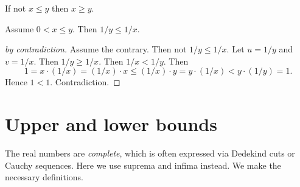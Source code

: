 \documentclass{article}
\begin{document}
\begin{forthel}
\begin{lemma}[syz]
If not $x \leq y$ then $x \geq y$.
\end{lemma}

\begin{proposition}
Assume $0 < x \leq y$.
Then $1/y \leq 1/x$.
\end{proposition}
\begin{proof}[by contradiction]
Assume the contrary. 
Then not $1/y \leq 1/x$. Let $u = 1/y$ and $v = 1/x$.
Then $1/y \geq 1/x$.
Then $1/x < 1/y$.
Then
\[ 1 = x \cdot (1/x) = (1/x) \cdot x \leq (1/x) \cdot y =
y \cdot (1/x) < y \cdot (1/y) = 1. \]
Hence $1 < 1$. Contradiction.
\end{proof}

\end{forthel}


\section{Upper and lower bounds}

The real numbers are {\em complete}, which is often expressed
via Dedekind cuts or Cauchy sequences. Here
we use suprema and infima instead. We make the 
necessary definitions. 
\end{document}
